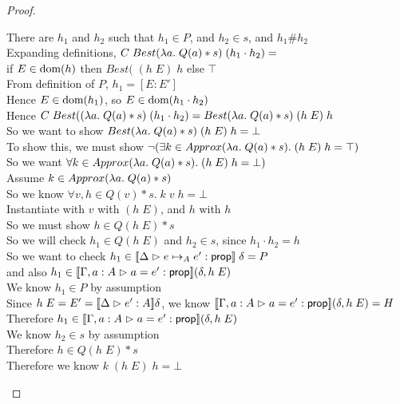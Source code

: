 \begin{proof}
\begin{tabbedproof}
    \oooooo There are $h_1$ and $h_2$ such that $h_1 \in P$, and $h_2 \in s$, and $h_1 \# h_2$ \\
    \oooooo Expanding definitions, $C\;Best(\semfun{a}{Q(a)*s})\;(h_1 \cdot h_2) = $ \\
    \oooooox if $E \in \domain{h}$ then $Best(\;(h\;E)\;h$ else $\top$ \\
    \oooooo From definition of $P$, $h_1 = [E:E']$ \\
    \oooooo Hence $E \in \domain{h_1}$, so $E \in \domain{h_1 \cdot h_2}$ \\
    \oooooo Hence $C\;Best((\semfun{a}{Q(a)*s})\;(h_1 \cdot h_2) = 
                   Best(\semfun{a}{Q(a)*s})\;(h\;E)\;h$ \\
    \oooooo So we want to show $Best(\semfun{a}{Q(a)*s})\;(h\;E)\;h = \bot$ \\
    \oooooo To show this, we must show $\lnot(\exists k \in Approx(\semfun{a}{Q(a)*s}).\; (h\;E)\;h = \top)$ \\
    \oooooo So we want $\forall k \in Approx(\semfun{a}{Q(a)*s}).\; (h\;E)\;h = \bot)$ \\
    \oooooo Assume $k \in Approx(\semfun{a}{Q(a)*s})$ \\
    \ooooooo So we know $\forall v, h \in Q(v)*s.\; k\;v\;h = \bot$ \\
    \ooooooo Instantiate with $v$ with $(h\;E)$, and $h$ with $h$ \\
    \ooooooo So we must show $h \in Q(h\;E)*s$ \\
    \ooooooo So we will check $h_1 \in Q(h\;E)$ and $h_2 \in s$, since $h_1 \cdot h_2 = h$ \\
    \ooooooo So we want to check $h_1 \in \interp{\judgeA{e \pointsto_A e'}{\assert}}\;\delta = P$ \\
    \ooooooox and also $h_1 \in \interp{\judgeA[\Gamma,a:A]{a = e'}{\assert}}(\delta,h\;E)$ \\
    \ooooooo We know $h_1 \in P$ by assumption \\
    \ooooooo Since $h\;E = E' = \interp{\judgeA{e'}{A}}\delta$, we know 
              $\interp{\judgeA[\Gamma,a:A]{a = e'}{\assert}}(\delta,h\;E) = H$ \\
    \ooooooo Therefore $h_1 \in \interp{\judgeA[\Gamma,a:A]{a = e'}{\assert}}(\delta,h\;E)$ \\
    \ooooooo We know $h_2 \in s$ by assumption\\
    \ooooooo Therefore $h \in Q(h\;E)*s$ \\
    \ooooooo Therefore we know $k\;(h\;E)\;h = \bot$ \\

\end{tabbedproof}
\end{proof}
